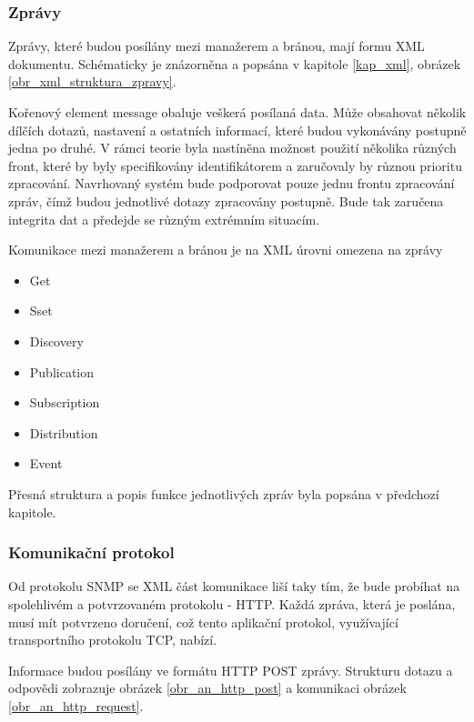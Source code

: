 \subsubsection*{Zprávy}
Zprávy, které budou posílány mezi manažerem a bránou, mají formu XML dokumentu. Schématicky je znázorněna a popsána v kapitole \ref{kap_xml}, obrázek \ref{obr_xml_struktura_zpravy}.

Kořenový element message obaluje veškerá posílaná data. Může obsahovat několik dílčích dotazů, nastavení a ostatních informací, které budou vykonávány postupně
jedna po druhé. V rámci teorie byla nastíněna možnost použití několika různých front, které by byly specifikovány identifikátorem a zaručovaly by různou
prioritu zpracování. Navrhovaný systém bude podporovat pouze jednu frontu zpracování zpráv, čímž budou jednotlivé dotazy zpracovány postupně. Bude tak zaručena
integrita dat a předejde se různým extrémním situacím.

Komunikace mezi manažerem a bránou je na XML úrovni omezena na zprávy
\begin{itemize}
	\item Get
	\item Sset
	\item Discovery
	\item Publication
	\item Subscription
	\item Distribution
	\item Event
\end{itemize}

Přesná struktura a popis funkce jednotlivých zpráv byla popsána v předchozí kapitole.


\subsubsection*{Komunikační protokol}
Od protokolu SNMP se XML část komunikace liší taky tím, že bude probíhat na spolehlivém a potvrzovaném protokolu - HTTP. Každá zpráva, která
je poslána, musí mít potvrzeno doručení, což tento aplikační protokol, využívající transportního protokolu TCP, nabízí. 

Informace budou posílány ve formátu HTTP POST zprávy. Strukturu dotazu a odpovědi zobrazuje obrázek \ref{obr_an_http_post} a komunikaci obrázek \ref{obr_an_http_request}.

